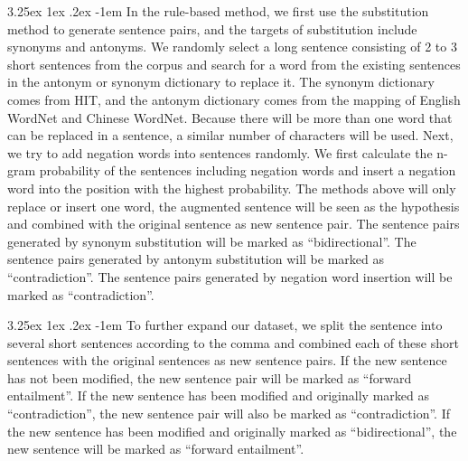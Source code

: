 \documentclass[12pt]{article}
\makeatletter
\renewcommand\paragraph{\@startsection{paragraph}{5}{\z@}%
  {3.25ex \@plus1ex \@minus.2ex}%
  {-1em}%
  {\normalfont\normalsize\bfseries}}
\makeatother
\begin{document}
\begin{CJK*}{UTF8}{bkai}
\begin{spacing}{1.77}
\paragraph{}
In the rule-based method, we first use the substitution method to generate sentence pairs, and the targets of substitution include synonyms and antonyms. We randomly select a long sentence consisting of 2 to 3 short sentences from the corpus and search for a word from the existing sentences in the antonym or synonym dictionary to replace it. The synonym dictionary comes from HIT, and the antonym dictionary comes from the mapping of English WordNet and Chinese WordNet. Because there will be more than one word that can be replaced in a sentence, a similar number of characters will be used. Next, we try to add negation words into sentences randomly. We first calculate the n-gram probability of the sentences including negation words and insert a negation word into the position with the highest probability. The methods above will only replace or insert one word, the augmented sentence will be seen as the hypothesis and combined with the original sentence as new sentence pair. The sentence pairs generated by synonym substitution will be marked as ``bidirectional''. The sentence pairs generated by antonym substitution will be marked as ``contradiction''. The sentence pairs generated by negation word insertion will be marked as ``contradiction''.

\paragraph{}
To further expand our dataset, we split the sentence into several short sentences according to the comma and combined each of these short sentences with the original sentences as new sentence pairs. If the new sentence has not been modified, the new sentence pair will be marked as ``forward entailment''. If the new sentence has been modified and originally marked as ``contradiction'', the new sentence pair will also be marked as ``contradiction''. If the new sentence has been modified and originally marked as ``bidirectional'', the new sentence will be marked as ``forward entailment''.


\end{spacing}
\end{CJK*}
\end{document}
